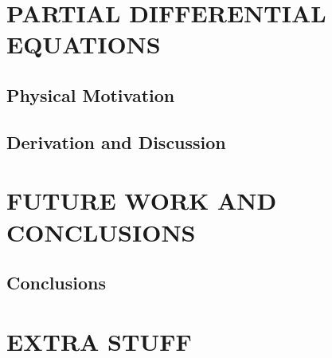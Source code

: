 \documentclass{article}
\begin{document}
\chapter{ PARTIAL DIFFERENTIAL EQUATIONS }
\label{pde}
\markright{}


\section{Physical Motivation}
\label{pde_motiv}


\section{Derivation and Discussion}
\label{pde_derv}

%

\chapter{ FUTURE WORK AND CONCLUSIONS}
\label{GeneralFutureWork}
\markright{}

\section{Conclusions}
\label{conc}


% 
\chapter{EXTRA STUFF}
\label{extra}
\markright{}



% 

\end{document}

